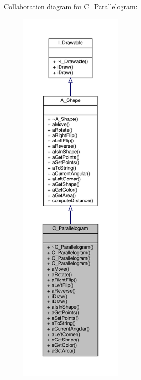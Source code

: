 Collaboration diagram for C\+\_\+\+Parallelogram\+:\nopagebreak
\begin{figure}[H]
\begin{center}
\leavevmode
\includegraphics[height=550pt]{classC__Parallelogram__coll__graph}
\end{center}
\end{figure}
